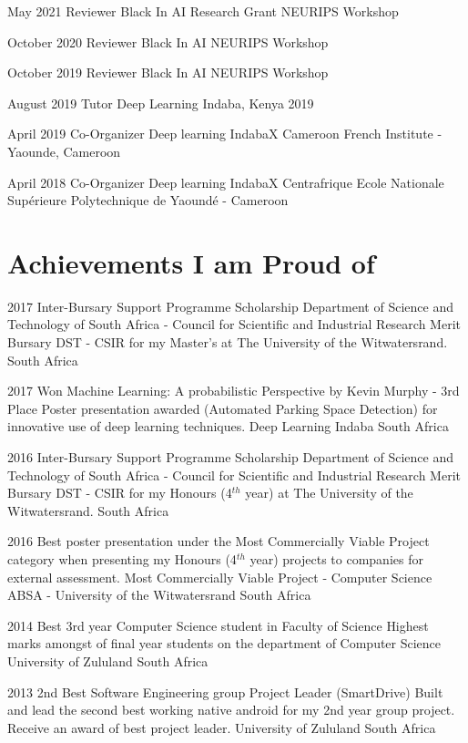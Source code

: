 \documentclass[letterpaper]{moderncv}        %
\begin{document}
\cventry
{May 2021}
{Reviewer Black In AI Research Grant}
{NEURIPS Workshop}
{}
{}
{}

\cventry
{October 2020}
{Reviewer Black In AI}
{NEURIPS Workshop}
{}
{}
{}

\cventry
{October 2019}
{Reviewer Black In AI}
{NEURIPS Workshop}
{}
{}
{}

\cventry
{August 2019}
{Tutor}
{Deep Learning Indaba, Kenya 2019}
{}
{}
{}

\cventry
{April 2019}
{Co-Organizer Deep learning IndabaX Cameroon}
{French Institute - Yaounde, Cameroon}
{}
{}
{}


\cventry
{April 2018}
{Co-Organizer Deep learning IndabaX Centrafrique}
{Ecole Nationale Supérieure Polytechnique de Yaoundé - Cameroon}
{}
{}
{}


\section{Achievements I am Proud of}

\cventry
{2017}
{Inter-Bursary Support Programme Scholarship}
{Department of Science and Technology of South Africa - Council for Scientific and Industrial Research Merit Bursary}
{DST - CSIR for my Master's at The University of the Witwatersrand.}
{South Africa}
{}

\cventry
{2017}
{Won Machine Learning: A probabilistic Perspective by Kevin Murphy - 3rd Place}
{Poster presentation awarded (Automated Parking Space Detection) for innovative use of deep learning techniques.}
{Deep Learning Indaba}
{South Africa}
{}

\cventry
{2016}
{Inter-Bursary Support Programme Scholarship}
{Department of Science and Technology of South Africa - Council for Scientific and Industrial Research Merit Bursary}
{DST - CSIR for my Honours (4$^{th}$ year) at The University of the Witwatersrand.}
{South Africa}
{}


\cventry
{2016}
{Best poster presentation under the Most Commercially Viable Project category when presenting my Honours (4$^{th}$ year) projects to companies for external assessment.}
{Most Commercially Viable Project - Computer Science}
{ABSA - University of the Witwatersrand}
{South Africa}
{}

\cventry
{2014}
{Best 3rd year Computer Science student in Faculty of Science}
{Highest marks amongst of final year students on the department of Computer Science}
{University of Zululand}
{South Africa}
{}


\cventry
{2013}
{2nd Best Software Engineering group Project Leader (SmartDrive)}
{Built and lead the second best working native android for my 2nd year group project. Receive an award of best project leader.}
{University of Zululand}
{South Africa}
{}
\end{document}
